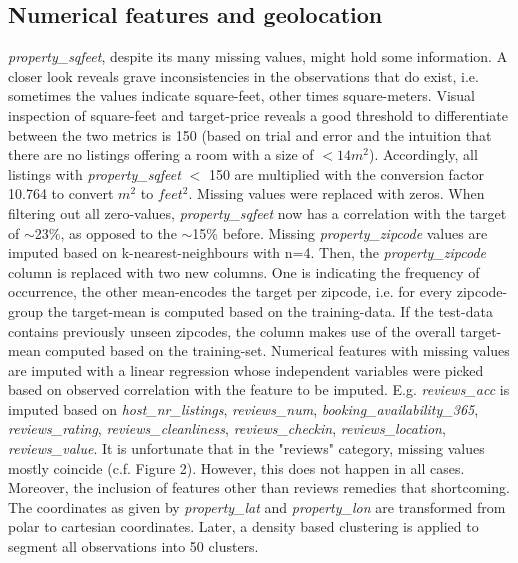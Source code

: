 \documentclass[11pt, oneside]{article}   	%
\begin{document}
\subsection{Numerical features and geolocation}
\textit{property\_sqfeet}, despite its many missing values, might hold some information. A closer look reveals grave inconsistencies in the observations that do exist, i.e. sometimes the values indicate square-feet, other times square-meters. Visual inspection of square-feet and target-price reveals a good threshold to differentiate between the two metrics is 150 (based on trial and error and the intuition that there are no listings offering a room with a size of $<14m^2$). Accordingly, all listings with \textit{property\_sqfeet} $<$ 150 are multiplied with the conversion factor 10.764 to convert $m^2$ to $feet^2$.  Missing values were replaced with zeros. When filtering out all zero-values, \textit{property\_sqfeet} now has a correlation with the target of $\sim$23\%, as opposed to the $\sim$15\% before.\newline
\newline
Missing \textit{property\_zipcode} values are imputed based on k-nearest-neighbours with n=4. Then, the \textit{property\_zipcode} column is replaced with two new columns. One is indicating the frequency of occurrence, the other mean-encodes the target per zipcode, i.e. for every zipcode-group the target-mean is computed based on the training-data. If the test-data contains previously unseen zipcodes, the column makes use of the overall target-mean computed based on the training-set.\newline
\newline
Numerical features with missing values are imputed with a linear regression whose independent variables were picked based on observed correlation with the feature to be imputed. E.g. \textit{reviews\_acc} is imputed based on \textit{host\_nr\_listings}, \textit{reviews\_num}, \textit{booking\_availability\_365}, \textit{reviews\_rating}, \textit{reviews\_cleanliness}, \textit{reviews\_checkin}, \textit{reviews\_location}, \textit{reviews\_value}. It is unfortunate that in the "reviews" category, missing values mostly coincide (c.f. Figure 2). However, this does not happen in all cases. Moreover, the inclusion of features other than reviews remedies that shortcoming. 
\newline
The coordinates as given by \textit{property\_lat} and \textit{property\_lon} are transformed from polar to cartesian coordinates. Later, a density based clustering is applied to segment all observations into 50 clusters.
\newline
\end{document}
